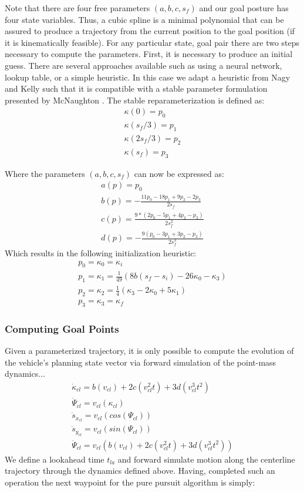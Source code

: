 \documentclass{easychair}
\theoremstyle{theorem}
\theoremstyle{remark}
\begin{document}
Note that there are four free parameters $(a,b,c,s_f)$ and our goal posture has four state variables. Thus, a cubic spline is a minimal polynomial that can be assured to produce a trajectory from the current position to the goal position (if it is kinematically feasible). For any particular state, goal pair there are two steps necessary to compute the parameters. First, it is necessary to produce an initial guess. There are several approaches available such as using a neural network, lookup table, or a simple heuristic. In this case we adapt a heuristic from Nagy and Kelly \cite{nagy2001trajectory} such that it is compatible with a stable parameter formulation presented by McNaughton \cite{McNaughton_2011_6927}. The stable reparameterization is defined as:
\begin{gather}
\kappa(0)=p_0\\
\kappa(s_f/3)=p_1\\
\kappa(2s_f/3)=p_2\\
\kappa(s_f)=p_3
\end{gather}

Where the parameters $(a,b,c,s_f)$ can now be expressed as:
\begin{gather}
a(p)=p_0\\
b(p)=-\frac{11p_0 - 18p_1+9p_2-2p_3}{2s_f}\\
c(p)=\frac{9*(2p_0-5p_1+4p_2-p_3)}{2s_f^2}\\
d(p)=-\frac{9(p_0-3p_1 +3p_2-p_3)}{2s_f^3}
\end{gather}
Which results in the following initialization heuristic:
\begin{gather}
p_0=\kappa_0=\kappa_i\\ 
p_1=\kappa_1= \frac{1}{49}(8b(s_f-s_i)-26\kappa_0-\kappa_3)\\
p_2=\kappa_2=\frac{1}{4}(\kappa_3-2\kappa_0+5\kappa_1)\\
p_3=\kappa_3=\kappa_f
\end{gather}
\subsubsection{Computing Goal Points} 
Given a parameterized trajectory, it is only possible to compute the evolution of the vehicle's planning state vector via forward simulation of the point-mass dynamics...
\begin{gather}
	    \dot{\kappa}_{cl} = b\left(v_{cl}\right) + 2c\left(v_{cl}^{2}t\right) + 3d\left(v_{cl}^{3}t^{2}\right) \\
	    \dot{\Psi}_{cl}= v_{cl}\left(\kappa_{cl}\right)	\\
	    \dot{s}_{x_{cl}}= v_{cl}\left(cos(\Psi_{cl})\right)\\
	    \dot{s}_{y_{cl}}= v_{cl}\left(sin(\Psi_{cl})\right)\\
	    \ddot{\Psi}_{cl} =v_{cl} \left( b\left(v_{cl}\right) + 2c\left(v_{cl}^{2}t\right) + 3d\left(v_{cl}^{3}t^{2}\right) \right)	    
\end{gather}
We define a lookahead time $t_{la}$ and forward simulate motion along the centerline trajectory through the dynamics defined above. Having, completed such an operation the next waypoint for the pure pursuit algorithm is simply:
\end{document}
